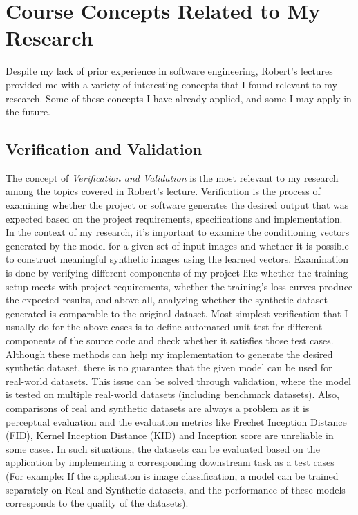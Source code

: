 \documentclass[a4paper, 11pt]{article}
\begin{document}
\section{Course Concepts Related to My Research}
Despite my lack of prior experience in software engineering, Robert's lectures provided me with a variety of interesting concepts that I found relevant to my research. Some of these concepts I have already applied, and some I may apply in the future. 

\subsection{Verification and Validation}
The concept of \textit{Verification and Validation} is the most relevant to my research among the topics covered in Robert's lecture. Verification is the process of examining whether the project or software generates the desired output that was expected based on the project requirements, specifications and implementation. In the context of my research, it's important to examine the conditioning vectors generated by the model for a given set of input images and whether it is possible to construct meaningful synthetic images using the learned vectors. Examination is done by verifying different components of my project like whether the training setup meets with project requirements, whether the training's loss curves produce the expected results, and above all, analyzing whether the synthetic dataset generated is comparable to the original dataset. Most simplest verification that I usually do for the above cases is to define automated unit test for different components of the source code and check whether it satisfies those test cases. Although these methods can help my implementation to generate the desired synthetic dataset, there is no guarantee that the given model can be used for real-world datasets. This issue can be solved through validation, where the model is tested on multiple real-world datasets (including benchmark datasets). Also, comparisons of real and synthetic datasets are always a problem as it is perceptual evaluation and the evaluation metrics like Frechet Inception Distance (FID)\cite{heusel2017gans}, Kernel Inception Distance (KID)\cite{binkowski2018demystifying} and Inception score are unreliable in some cases. In such situations, the datasets can be evaluated based on the application by implementing a corresponding downstream task as a test cases (For example: If the application is image classification, a model can be trained separately on Real and Synthetic datasets, and the performance of these models corresponds to the quality of the datasets). 
\end{document}
